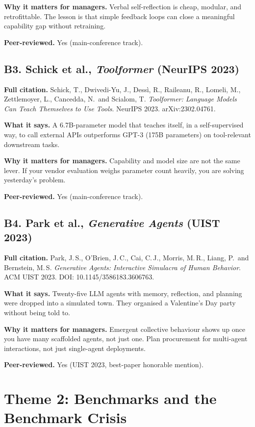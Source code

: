 \documentclass[11pt,a4paper]{article}
\begin{document}
\textbf{Why it matters for managers.}
Verbal self-reflection is cheap, modular, and retrofittable. The lesson
is that simple feedback loops can close a meaningful capability gap
without retraining.

\textbf{Peer-reviewed.} Yes (main-conference track).

\subsection*{B3. Schick et al., \emph{Toolformer} (NeurIPS 2023)}

\textbf{Full citation.}
Schick, T., Dwivedi-Yu, J., Dess{\`i}, R., Raileanu, R., Lomeli, M.,
Zettlemoyer, L., Cancedda, N.\ and Scialom, T.
\emph{Toolformer: Language Models Can Teach Themselves to Use Tools}.
NeurIPS 2023. arXiv:2302.04761.

\textbf{What it says.}
A 6.7B-parameter model that teaches itself, in a self-supervised way,
to call external APIs outperforms GPT-3 (175B parameters) on
tool-relevant downstream tasks.

\textbf{Why it matters for managers.}
Capability and model size are not the same lever. If your vendor
evaluation weighs parameter count heavily, you are solving yesterday's
problem.

\textbf{Peer-reviewed.} Yes (main-conference track).

\subsection*{B4. Park et al., \emph{Generative Agents} (UIST 2023)}

\textbf{Full citation.}
Park, J.\,S., O'Brien, J.\,C., Cai, C.\,J., Morris, M.\,R.,
Liang, P.\ and Bernstein, M.\,S.
\emph{Generative Agents: Interactive Simulacra of Human Behavior}.
ACM UIST 2023. DOI: 10.1145/3586183.3606763.

\textbf{What it says.}
Twenty-five LLM agents with memory, reflection, and planning were
dropped into a simulated town. They organised a Valentine's Day
party without being told to.

\textbf{Why it matters for managers.}
Emergent collective behaviour shows up once you have many scaffolded
agents, not just one. Plan procurement for multi-agent interactions,
not just single-agent deployments.

\textbf{Peer-reviewed.} Yes (UIST 2023, best-paper honorable mention).

\section*{Theme 2: Benchmarks and the Benchmark Crisis}
\end{document}
